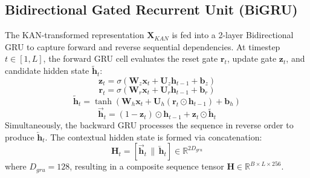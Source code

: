 \documentclass[conference]{IEEEtran}
\begin{document}
\subsection{Bidirectional Gated Recurrent Unit (BiGRU)}
The KAN-transformed representation $\mathbf{X}_{KAN}$ is fed into a 2-layer Bidirectional GRU to capture forward and reverse sequential dependencies. At timestep $t \in [1, L]$, the forward GRU cell evaluates the reset gate $\mathbf{r}_t$, update gate $\mathbf{z}_t$, and candidate hidden state $\tilde{\mathbf{h}}_t$:
\begin{equation}
    \mathbf{z}_t = \sigma(\mathbf{W}_z \mathbf{x}_t + \mathbf{U}_z \mathbf{h}_{t-1} + \mathbf{b}_z)
\end{equation}
\begin{equation}
    \mathbf{r}_t = \sigma(\mathbf{W}_r \mathbf{x}_t + \mathbf{U}_r \mathbf{h}_{t-1} + \mathbf{b}_r)
\end{equation}
\begin{equation}
    \tilde{\mathbf{h}}_t = \tanh(\mathbf{W}_h \mathbf{x}_t + \mathbf{U}_h (\mathbf{r}_t \odot \mathbf{h}_{t-1}) + \mathbf{b}_h)
\end{equation}
\begin{equation}
    \overrightarrow{\mathbf{h}}_t = (1 - \mathbf{z}_t) \odot \mathbf{h}_{t-1} + \mathbf{z}_t \odot \tilde{\mathbf{h}}_t
\end{equation}
Simultaneously, the backward GRU processes the sequence in reverse order to produce $\overleftarrow{\mathbf{h}}_t$. The contextual hidden state is formed via concatenation:
\begin{equation}
    \mathbf{H}_t = \left[\overrightarrow{\mathbf{h}}_t \,\|\, \overleftarrow{\mathbf{h}}_t\right] \in \mathbb{R}^{2 D_{gru}}
\end{equation}
where $D_{gru} = 128$, resulting in a composite sequence tensor $\mathbf{H} \in \mathbb{R}^{B \times L \times 256}$.
\end{document}
